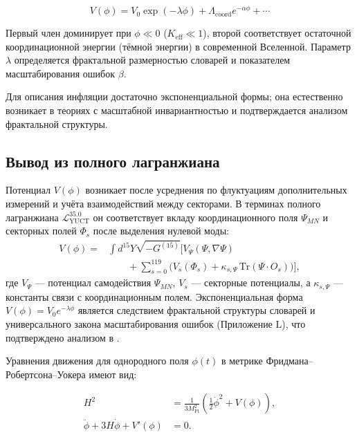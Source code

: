 \documentclass[11pt,a4paper]{article}
\newcommand{\Keff}{K_{\mathrm{eff}}}
\newcommand{\Mpl}{M_{\mathrm{Pl}}}
\begin{document}
	\begin{equation}
		V(\phi) = V_0 \exp\left( -\lambda \phi \right) + \Lambda_{\mathrm{coord}} e^{-\alpha \phi} + \cdots
		\label{eq:potential}
	\end{equation}
	
	Первый член доминирует при \(\phi \ll 0\) (\(\Keff \ll 1\)), второй соответствует остаточной координационной энергии (тёмной энергии) в современной Вселенной. Параметр \(\lambda\) определяется фрактальной размерностью словарей и показателем масштабирования ошибок \(\beta\).
	
	Для описания инфляции достаточно экспоненциальной формы; она естественно возникает в теориях с масштабной инвариантностью и подтверждается анализом фрактальной структуры.
	
	\subsection{Вывод из полного лагранжиана}
	
	Потенциал \(V(\phi)\) возникает после усреднения по флуктуациям дополнительных измерений и учёта взаимодействий между секторами. В терминах полного лагранжиана \(\mathcal{L}_{\text{YUCT}}^{35.0}\) он соответствует вкладу координационного поля \(\Psi_{MN}\) и секторных полей \(\Phi_s\) после выделения нулевой моды:
	\begin{align}
		V(\phi) = &\int d^{15}Y \sqrt{-G^{(15)}} \Big[ V_{\Psi}(\Psi,\nabla\Psi) \nonumber\\
		&\qquad + \sum_{s=0}^{119} \big( V_s(\Phi_s) + \kappa_{s,\Psi}\,\mathrm{Tr}(\Psi\cdot O_s) \big) \Big],
	\end{align}
	где \(V_{\Psi}\) — потенциал самодействия \(\Psi_{MN}\), \(V_s\) — секторные потенциалы, а \(\kappa_{s,\Psi}\) — константы связи с координационным полем. Экспоненциальная форма \(V(\phi)=V_0 e^{-\lambda\phi}\) является следствием фрактальной структуры словарей и универсального закона масштабирования ошибок (Приложение L), что подтверждено анализом в \cite{Yakushev2026}.
	
	Уравнения движения для однородного поля \(\phi(t)\) в метрике Фридмана–Робертсона–Уокера имеют вид:
	
	\begin{align}
		H^2 &= \frac{1}{3\Mpl^2} \left( \frac{1}{2}\dot{\phi}^2 + V(\phi) \right), \label{eq:friedman1} \\
		\ddot{\phi} + 3H\dot{\phi} + V'(\phi) &= 0. \label{eq:field}
	\end{align}
	
\end{document}
